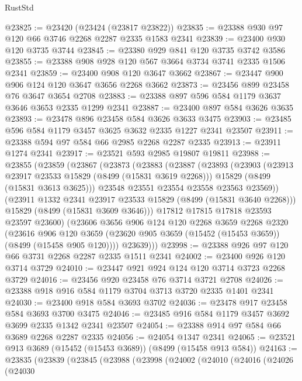 \begin{lexlean}{RustStd}
\begin{coremodule}
@23825 := @23420 (@23424 (@23817 @23822))
@23835 := @23388 @930 @97 @120 @66 @3746 @2268 @2287 @2335 @1583 @2341
@23839 := @23400 @930 @120 @3735 @3744
@23845 := @23380 @929 @841 @120 @3735 @3742 @3586
@23855 := @23388 @908 @928 @120 @567 @3664 @3734 @3741 @2335 @1506 @2341
@23859 := @23400 @908 @120 @3647 @3662
@23867 := @23447 @900 @906 @124 @120 @3647 @3656 @2268 @3662
@23873 := @23456 @899 @23458 @76 @3647 @3654 @2708
@23883 := @23388 @897 @596 @584 @1179 @3637 @3646 @3653 @2335 @1299 @2341
@23887 := @23400 @897 @584 @3626 @3635
@23893 := @23478 @896 @23458 @584 @3626 @3633 @3475
@23903 := @23485 @596 @584 @1179 @3457 @3625 @3632 @2335 @1227 @2341 @23507
@23911 := @23388 @594 @97 @584 @66 @2985 @2268 @2287 @2335
@23913 := @23911 @1274 @2341
@23917 := @23521 @593 @2985 @19807 @19811
@23988 := @23855
    (@23859
      (@23867
        (@23873
          (@23883
            (@23887
              (@23893
                (@23903
                  (@23913 @23917 @23533 @15829 (@8499 (@15831 @3619 @2268)))
                  @15829
                  (@8499 (@15831 @3613 @3625)))
                @23548
                @23551
                @23554
                @23558
                @23563
                @23569))
            (@23911 @1332 @2341 @23917 @23533 @15829 (@8499 (@15831 @3640 @2268)))
            @15829
            (@8499 (@15831 @3609 @3646)))
          @17812
          @17815
          @17818
          @23593
          @23597
          @23600)
        (@23606
          @3656
          @906
          @124
          @120
          @2268
          @3659
          @2268
          @2320
          (@23616
            @906
            @120
            @3659
            (@23620 @905 @3659 (@15452 (@15453 @3659)) (@8499 (@15458 @905 @120))))
          @23639)))
@23998 := @23388 @926 @97 @120 @66 @3731 @2268 @2287 @2335 @1511 @2341
@24002 := @23400 @926 @120 @3714 @3729
@24010 := @23447 @921 @924 @124 @120 @3714 @3723 @2268 @3729
@24016 := @23456 @920 @23458 @76 @3714 @3721 @2708
@24026 := @23388 @918 @916 @584 @1179 @3704 @3713 @3720 @2335 @1401 @2341
@24030 := @23400 @918 @584 @3693 @3702
@24036 := @23478 @917 @23458 @584 @3693 @3700 @3475
@24046 := @23485 @916 @584 @1179 @3457 @3692 @3699 @2335 @1342 @2341 @23507
@24054 := @23388 @914 @97 @584 @66 @3689 @2268 @2287 @2335
@24056 := @24054 @1347 @2341
@24065 := @23521 @913 @3689 (@15452 (@15453 @3689)) (@8499 (@15458 @913 @584))
@24163 := @23835
    (@23839
      (@23845
        (@23988
          (@23998
            (@24002
              (@24010
                (@24016
                  (@24026
                    (@24030

\end{coremodule}
\end{lexlean}
